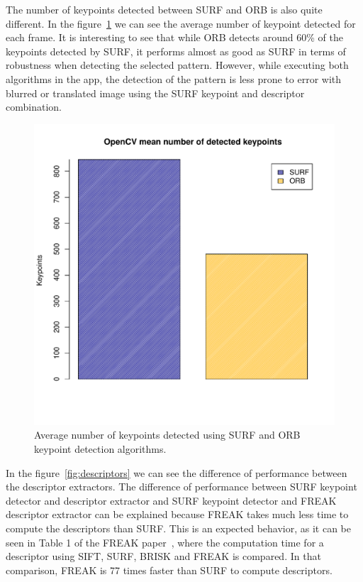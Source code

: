 The number of keypoints detected between SURF and ORB is also quite different. In
the figure~\ref{fig:numberkp} we can see the average number of keypoint detected for
each frame. It is interesting to see that while ORB detects around 60\% of the
keypoints detected by SURF, it performs almost as good as SURF in terms of
robustness when detecting the selected pattern. However, while executing both
algorithms in the app, the detection of the pattern is less prone to error with
blurred or translated image using the SURF keypoint and descriptor combination. 

\begin{figure}
\centering
\includegraphics[scale=0.75]{performance/keypoints-number.pdf}
\caption{\label{fig:numberkp} Average number of keypoints detected using SURF and
  ORB keypoint detection algorithms.}
\end{figure} 

In the figure~\ref{fig:descriptors} we can see the difference of performance between
the descriptor extractors. The difference of performance between SURF keypoint
detector and descriptor extractor and SURF keypoint detector and FREAK descriptor
extractor can be explained because FREAK takes much less time to compute the
descriptors than SURF. This is an expected behavior, as it can be seen in Table 1
of the FREAK paper~\cite{Ortiz:2012:FFR:2354409.2354903}, where the computation time
for a descriptor using SIFT, SURF, BRISK and FREAK is compared. In that comparison,
FREAK is 77 times faster than SURF to compute descriptors.

